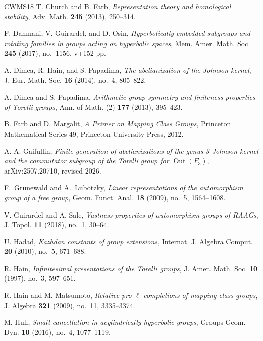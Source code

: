 \documentclass[11pt,a4paper]{article}
\theoremstyle{definition}
\begin{document}
\begin{thebibliography}{CWMS18}
T. Church and B. Farb, \emph{Representation theory and homological
stability}, Adv. Math. \textbf{245} (2013), 250--314.

F. Dahmani, V. Guirardel, and D. Osin,
\emph{Hyperbolically embedded subgroups and rotating families
in groups acting on hyperbolic spaces},
Mem. Amer. Math. Soc. \textbf{245} (2017), no.~1156, v+152 pp.


A. Dimca, R. Hain, and S. Papadima,
\emph{The abelianization of the Johnson kernel},
J. Eur. Math. Soc. \textbf{16} (2014), no.~4, 805--822.


A. Dimca and S. Papadima,
\emph{Arithmetic group symmetry and finiteness properties of Torelli
groups}, Ann. of Math. (2) \textbf{177} (2013), 395--423.


B. Farb and D. Margalit,
\emph{A Primer on Mapping Class Groups}, Princeton Mathematical
Series 49, Princeton University Press, 2012.

A. A. Gaifullin,
\emph{Finite generation of abelianizations of the genus 3 Johnson
kernel and the commutator subgroup of the Torelli group for
\(\operatorname{Out}(F_3)\)},
arXiv:2507.20710, revised 2026.

F.~Grunewald and A.~Lubotzky,
\emph{Linear representations of the automorphism group of a
free group},
Geom. Funct. Anal. \textbf{18} (2009), no.~5, 1564--1608.

V. Guirardel and A. Sale,
\emph{Vastness properties of automorphism groups of RAAGs},
J. Topol. \textbf{11} (2018), no.~1, 30--64.

U. Hadad,
\emph{Kazhdan constants of group extensions},
Internat. J. Algebra Comput. \textbf{20} (2010), no.~5, 671--688.

R. Hain, \emph{Infinitesimal presentations of the Torelli groups},
J. Amer. Math. Soc. \textbf{10} (1997), no.~3, 597--651.


R. Hain and M. Matsumoto, \emph{Relative pro-\(\ell\)
completions of mapping class groups}, J. Algebra \textbf{321}
(2009), no.~11, 3335--3374.


M. Hull, \emph{Small cancellation in acylindrically hyperbolic
groups}, Groups Geom. Dyn. \textbf{10} (2016), no.~4, 1077--1119.



\end{thebibliography}
\end{document}
